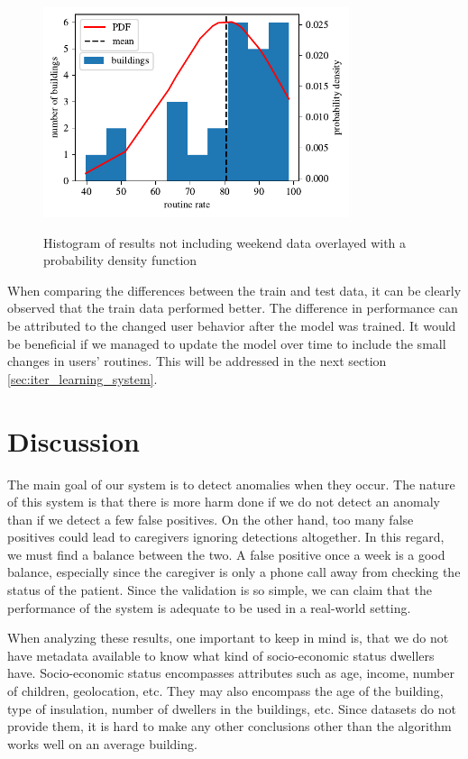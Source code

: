 \begin{figure}[H]
    \centering
    \caption{Histogram of results not including weekend data overlayed with a probability density function}
    \includegraphics[width=0.8\textwidth]{Figures/EC/ec_histogram_week_only.pdf}
    \label{fig:ec_histogram_week_only}
\end{figure}


When comparing the differences between the train and test data, it can be clearly observed that the train data performed better. 
The difference in performance can be attributed to the changed user behavior after the model was trained. 
It would be beneficial if we managed to update the model over time to include the small changes in users' routines. 
This will be addressed in the next section \ref{sec:iter_learning_system}.

\section{Discussion}

The main goal of our system is to detect anomalies when they occur.
The nature of this system is that there is more harm done if we do not detect an anomaly than if we detect a few false positives.
On the other hand, too many false positives could lead to caregivers ignoring detections altogether.
In this regard, we must find a balance between the two.
A false positive once a week is a good balance, especially since the caregiver is only a phone call away from checking the status of the patient.
Since the validation is so simple, we can claim that the performance of the system is adequate to be used in a real-world setting.

When analyzing these results, one important to keep in mind is,
that we do not have metadata available to know what kind of socio-economic status dwellers have.
Socio-economic status encompasses attributes such as age, income, number of children, geolocation, etc.
They may also encompass the age of the building, type of insulation, number of dwellers in the buildings, etc.
Since datasets do not provide them, it is hard to make any other conclusions other than the algorithm works well on an average building.


